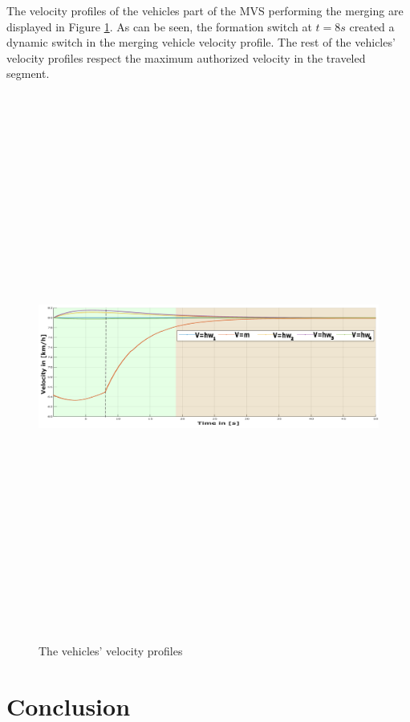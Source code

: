        
The velocity profiles of the vehicles part of the MVS performing the merging are displayed in Figure \ref{fig:scenario02:formation_velocity}. As can be seen, the formation switch at $t=8s$ created a dynamic switch in the merging vehicle velocity profile. The rest of the vehicles' velocity profiles respect the maximum authorized velocity in the traveled segment. 
     \begin{figure}[!h]
        \centering 
        \includegraphics[width=13cm,height=18cm,keepaspectratio]{chapters/Chapitre_6/Figures/Scenario_2/Scenario2_velocity.pdf}
        \caption{The vehicles' velocity profiles}
        \label{fig:scenario02:formation_velocity}
        \end{figure}
 
\section{Conclusion}

